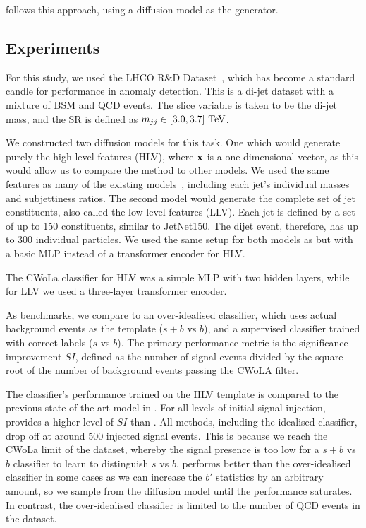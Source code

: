 \drapes follows this approach, using a diffusion model as the generator.

\subsection{Experiments}

For this study, we used the LHCO R\&D Dataset~\cite{LHCO}, which has become a standard candle for performance in anomaly detection.
This is a di-jet dataset with a mixture of BSM and QCD events.
The slice variable is taken to be the di-jet mass, and the SR is defined as $m_{jj} \in [3.0, 3.7]~\TeV$.

We constructed two diffusion models for this task.
One which would generate purely the high-level features (\drapes HLV), where $\mathbf{x}$ is a one-dimensional vector, as this would allow us to compare the method to other models.
We used the same features as many of the existing models~\cite{CURTAINs, feta, lacathode}, including each jet's individual masses and subjettiness ratios.
The second model would generate the complete set of jet constituents, also called the low-level features (\drapes LLV).
Each jet is defined by a set of up to 150 constituents, similar to JetNet150.
The dijet event, therefore, has up to 300 individual particles.
We used the same setup for both models as \pcdroid but with a basic MLP instead of a transformer encoder for \drapes HLV.

The CWoLa classifier for \drapes HLV was a simple MLP with two hidden layers, while for \drapes LLV we used a three-layer transformer encoder.

As benchmarks, we compare to an over-idealised classifier, which uses actual background events as the template ($s+b$ vs $b$), and a supervised classifier trained with correct labels ($s$ vs $b$).
The primary performance metric is the significance improvement $SI$, defined as the number of signal events divided by the square root of the number of background events passing the CWoLA filter.

The classifier's performance trained on the \drapes HLV template is compared to the previous state-of-the-art model \FfF in .
For all levels of initial signal injection, \drapes provides a higher level of $SI$ than \FfF.
All methods, including the idealised classifier, drop off at around 500 injected signal events.
This is because we reach the CWoLa limit of the dataset, whereby the signal presence is too low for a $s+b$ vs $b$ classifier to learn to distinguish $s$ vs $b$.
\drapes performs better than the over-idealised classifier in some cases as we can increase the $b'$ statistics by an arbitrary amount, so we sample from the diffusion model until the performance saturates.
In contrast, the over-idealised classifier is limited to the number of QCD events in the dataset.

